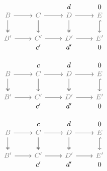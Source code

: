 \documentclass[12pt]{article}
\begin{document}
\begin{equation*}
  \begin{tikzcd}
    &\phantom{c} &d & 0 \\[-2em]
    \color{gray}B\rar\dar[two heads] & \color{gray}C\rar\dar & \color{gray}D\rar\dar[two heads,black] & \color{gray}E\dar[hook] \\
    \color{gray}B'\rar &\color{gray} C'\rar &\color{gray} D'\rar &\color{gray} E' \\[-2em]
    & c' & d' & 0
  \end{tikzcd}
\end{equation*}

\begin{equation*}
  \begin{tikzcd}
    & c&d & 0 \\[-2em]
    \color{gray}B\rar\dar[two heads] & \color{gray}C\rar\dar & \color{gray}D\rar\dar[two heads] & \color{gray}E\dar[hook] \\
    \color{gray}B'\rar &\color{gray} C'\rar &\color{gray} D'\rar &\color{gray} E' \\[-2em]
    & c' & d' & 0
  \end{tikzcd}
\end{equation*}



\begin{equation*}
  \begin{tikzcd}
    & c&d & 0 \\[-2em]
    \color{gray}B\rar\dar[two heads] & \color{gray}C\rar\dar[black,two heads] & \color{gray}D\rar\dar[two heads] & \color{gray}E\dar[hook] \\
    \color{gray}B'\rar &\color{gray} C'\rar &\color{gray} D'\rar &\color{gray} E' \\[-2em]
    & c' & d' & 0
  \end{tikzcd}
\end{equation*}

 
\end{document}
